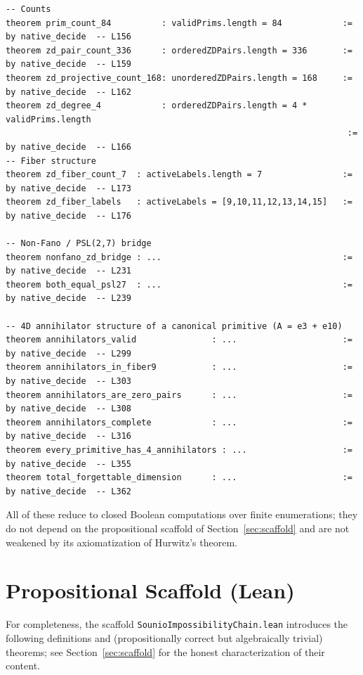\documentclass{article}
\begin{document}
\begin{lstlisting}[basicstyle=\tiny\ttfamily]
-- Counts
theorem prim_count_84          : validPrims.length = 84            := by native_decide  -- L156
theorem zd_pair_count_336      : orderedZDPairs.length = 336       := by native_decide  -- L159
theorem zd_projective_count_168: unorderedZDPairs.length = 168     := by native_decide  -- L162
theorem zd_degree_4            : orderedZDPairs.length = 4 * validPrims.length
                                                                    := by native_decide  -- L166
-- Fiber structure
theorem zd_fiber_count_7  : activeLabels.length = 7                := by native_decide  -- L173
theorem zd_fiber_labels   : activeLabels = [9,10,11,12,13,14,15]   := by native_decide  -- L176

-- Non-Fano / PSL(2,7) bridge
theorem nonfano_zd_bridge : ...                                    := by native_decide  -- L231
theorem both_equal_psl27  : ...                                    := by native_decide  -- L239

-- 4D annihilator structure of a canonical primitive (A = e3 + e10)
theorem annihilators_valid               : ...                     := by native_decide  -- L299
theorem annihilators_in_fiber9           : ...                     := by native_decide  -- L303
theorem annihilators_are_zero_pairs      : ...                     := by native_decide  -- L308
theorem annihilators_complete            : ...                     := by native_decide  -- L316
theorem every_primitive_has_4_annihilators : ...                   := by native_decide  -- L355
theorem total_forgettable_dimension      : ...                     := by native_decide  -- L362
\end{lstlisting}

All of these reduce to closed Boolean computations over finite enumerations;
they do not depend on the propositional scaffold of
Section~\ref{sec:scaffold} and are not weakened by its axiomatization of
Hurwitz's theorem.

\section{Propositional Scaffold (Lean)}
\label{app:scaffold}

For completeness, the scaffold
\texttt{SounioImpossibilityChain.lean} introduces the following definitions
and (propositionally correct but algebraically trivial) theorems; see
Section~\ref{sec:scaffold} for the honest characterization of their
content.
\end{document}
